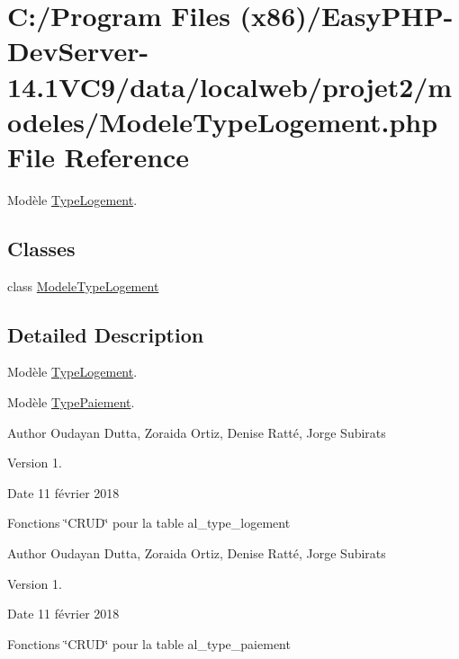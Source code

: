 \hypertarget{_modele_type_logement_8php}{}\section{C\+:/\+Program Files (x86)/\+Easy\+P\+H\+P-\/\+Dev\+Server-\/14.1\+V\+C9/data/localweb/projet2/modeles/\+Modele\+Type\+Logement.php File Reference}
\label{_modele_type_logement_8php}


Modèle \hyperlink{class_type_logement}{Type\+Logement}.  


\subsection*{Classes}
\begin{DoxyCompactItemize}
\item 
class \hyperlink{class_modele_type_logement}{Modele\+Type\+Logement}
\end{DoxyCompactItemize}


\subsection{Detailed Description}
Modèle \hyperlink{class_type_logement}{Type\+Logement}. 

Modèle \hyperlink{class_type_paiement}{Type\+Paiement}.

\begin{DoxyAuthor}{Author}
Oudayan Dutta, Zoraida Ortiz, Denise Ratté, Jorge Subirats 
\end{DoxyAuthor}
\begin{DoxyVersion}{Version}
1. 
\end{DoxyVersion}
\begin{DoxyDate}{Date}
11 février 2018
\end{DoxyDate}
Fonctions \char`\"{}\+C\+R\+U\+D\char`\"{} pour la table al\+\_\+type\+\_\+logement

\begin{DoxyAuthor}{Author}
Oudayan Dutta, Zoraida Ortiz, Denise Ratté, Jorge Subirats 
\end{DoxyAuthor}
\begin{DoxyVersion}{Version}
1. 
\end{DoxyVersion}
\begin{DoxyDate}{Date}
11 février 2018
\end{DoxyDate}
Fonctions \char`\"{}\+C\+R\+U\+D\char`\"{} pour la table al\+\_\+type\+\_\+paiement 